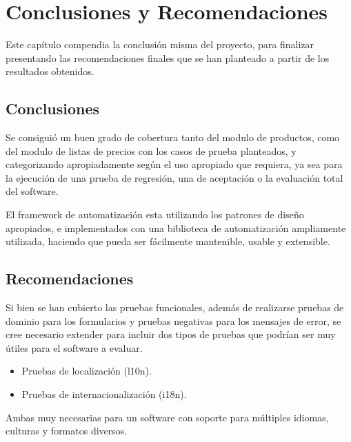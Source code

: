 \chapter{Conclusiones y Recomendaciones}

Este capítulo compendia la conclusión misma del proyecto, para finalizar
presentando las recomendaciones finales que se han planteado a partir de los
resultados obtenidos.

\section{Conclusiones}
Se consiguió un buen grado de cobertura tanto del modulo de productos, como del
modulo de listas de precios con los casos de prueba planteados, y categorizando
apropiadamente según el uso apropiado que requiera, ya sea para la ejecución de
una prueba de regresión, una de aceptación o la evaluación total del software.

El framework de automatización esta utilizando los patrones de diseño
apropiados, e implementados con una biblioteca de automatización ampliamente
utilizada, haciendo que pueda ser fácilmente mantenible, usable y extensible.

\section{Recomendaciones}
Si bien se han cubierto las pruebas funcionales, además de realizarse pruebas
de dominio para los formularios y pruebas negativas para los mensajes de error,
se cree necesario extender para incluir dos tipos de pruebas que podrían ser
muy útiles para el software a evaluar.

\begin{itemize}
\item Pruebas de localización (l10n).
\item Pruebas de internacionalización (i18n).
\end{itemize}

Ambas muy necesarias para un software con soporte para múltiples idiomas,
culturas y formatos diversos.

